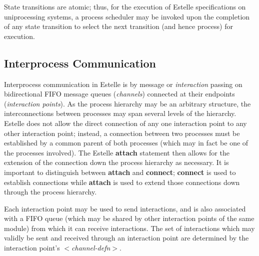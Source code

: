 State transitions are atomic; thus, for the execution of
Estelle specifications on uniprocessing systems, a process
scheduler may be invoked upon the completion of any state
transition to select the next transition (and hence process)
for execution.


\subsection[Interprocess Communication]{Interprocess
Communication}
\label{IPC}

Interprocess communication in Estelle is by message or
{\em interaction} passing on bidirectional FIFO message queues
({\em channels}) connected at their endpoints ({\em interaction
points}). As the process hierarchy may be an arbitrary
structure, the interconnections between processes may span
several levels of the hierarchy. Estelle does not allow the
direct connection of any one interaction point to any other
interaction point; instead, a connection between two
processes must be established by a common parent of both
processes (which may in fact be one of the processes
involved). The Estelle {\bf attach} statement then allows for the
extension of the connection down the process hierarchy as
necessary. It is important to distinguish between {\bf attach}
and {\bf connect}; {\bf connect} is used to establish connections while
{\bf attach} is used to extend those connections down through the
process hierarchy.

Each interaction point may be used to send interactions,
and is also associated with a FIFO queue (which may be
shared by other interaction points of the same module) from
which it can receive interactions. The set of interactions
which may validly be sent and received through an
interaction point are determined by the interaction point's
$<${\em channel-defn}$>$.


